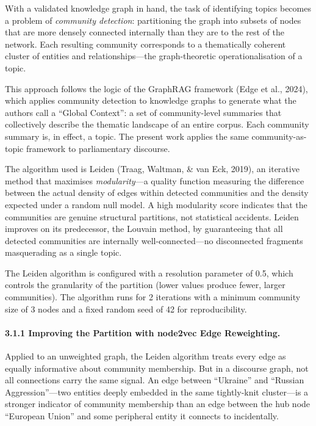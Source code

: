 \documentclass[11pt]{article}
\begin{document}
With a validated knowledge graph in hand, the task of identifying topics becomes a problem of \emph{community detection}: partitioning the graph into subsets of nodes that are more densely connected internally than they are to the rest of the network. Each resulting community corresponds to a thematically coherent cluster of entities and relationships---the graph-theoretic operationalisation of a topic.

This approach follows the logic of the GraphRAG framework (Edge et al., 2024), which applies community detection to knowledge graphs to generate what the authors call a ``Global Context'': a set of community-level summaries that collectively describe the thematic landscape of an entire corpus. Each community summary is, in effect, a topic. The present work applies the same community-as-topic framework to parliamentary discourse.

The algorithm used is Leiden (Traag, Waltman, \& van Eck, 2019), an iterative method that maximises \emph{modularity}---a quality function measuring the difference between the actual density of edges within detected communities and the density expected under a random null model. A high modularity score indicates that the communities are genuine structural partitions, not statistical accidents. Leiden improves on its predecessor, the Louvain method, by guaranteeing that all detected communities are internally well-connected---no disconnected fragments masquerading as a single topic.

The Leiden algorithm is configured with a resolution parameter of 0.5, which controls the granularity of the partition (lower values produce fewer, larger communities). The algorithm runs for 2 iterations with a minimum community size of 3 nodes and a fixed random seed of 42 for reproducibility.


\paragraph{3.1.1 Improving the Partition with node2vec Edge Reweighting.}


Applied to an unweighted graph, the Leiden algorithm treats every edge as equally informative about community membership. But in a discourse graph, not all connections carry the same signal. An edge between ``Ukraine'' and ``Russian Aggression''---two entities deeply embedded in the same tightly-knit cluster---is a stronger indicator of community membership than an edge between the hub node ``European Union'' and some peripheral entity it connects to incidentally.
\end{document}
